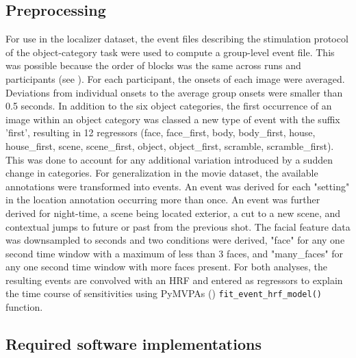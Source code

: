 \documentclass[a4paper, 12pt]{scrreprt}
\begin{document}
\subsection{Preprocessing}

For use in the localizer dataset, the event files describing the stimulation protocol of the object-category task were used to compute a group-level event file. This was possible because the order of blocks was the same across runs and participants (see \cite{sengupta2016studyforrest}). For each participant, the onsets of each image were averaged. Deviations from individual onsets to the average group onsets were smaller than 0.5 seconds. In addition to the six object categories, the first occurrence of an image within an object category was classed a new type of event with the suffix 'first', resulting in 12 regressors (face, face\_first, body, body\_first, house, house\_first, scene, scene\_first, object, object\_first, scramble, scramble\_first). This was done to account for any additional variation introduced by a sudden change in categories. 
For generalization in the movie dataset, the available annotations were transformed into events. An event was derived for each "setting" in the location annotation occurring more than once. An event was further derived for night-time, a scene being located exterior, a cut to a new scene, and contextual jumps to future or past from the previous shot. The facial feature data was downsampled to seconds and two conditions were derived, "face" for any one second time window with a maximum of less than 3 faces, and "many\_faces" for any one second time window with more faces present.
For both analyses, the resulting events are convolved with an HRF and entered as regressors to explain the time course of sensitivities using PyMVPAs (\cite{hanke2009pymvpa})  \texttt{fit\_event\_hrf\_model() }function. \newline

\subsection{Required software implementations}
\end{document}
